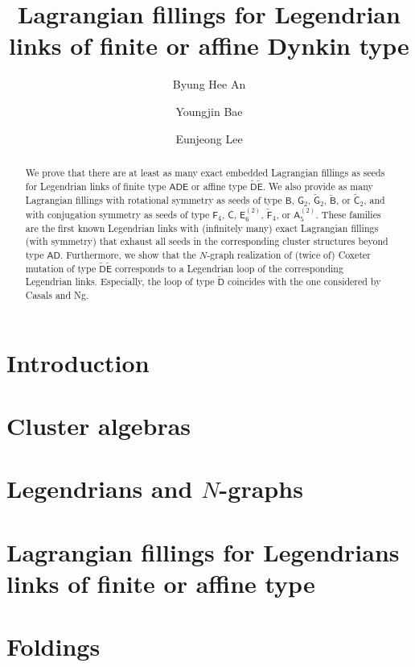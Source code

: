 \documentclass[reqno]{amsart}
\title{Lagrangian fillings for Legendrian links of finite or affine Dynkin type}
\author{Byung Hee An}
\author{Youngjin Bae}
\author{Eunjeong Lee}
\theoremstyle{plain}
\theoremstyle{remark}
\theoremstyle{definition}
\newcommand{\dynkinfont}{\mathsf}
\newcommand{\dynA}{\dynkinfont{A}}
\newcommand{\dynB}{\dynkinfont{B}}
\newcommand{\dynC}{\dynkinfont{C}}
\newcommand{\dynD}{\dynkinfont{D}}
\newcommand{\dynE}{\dynkinfont{E}}
\newcommand{\dynF}{\dynkinfont{F}}
\newcommand{\dynG}{\dynkinfont{G}}
\newcommand{\dynADE}{\dynkinfont{ADE}}
\newcommand{\exdynB}{\widetilde{\dynB}}
\newcommand{\exdynC}{\widetilde{\dynC}}
\newcommand{\exdynD}{\widetilde{\dynD}}
\newcommand{\exdynE}{\widetilde{\dynE}}
\newcommand{\exdynF}{\widetilde{\dynF}}
\newcommand{\exdynG}{\widetilde{\dynG}}
\newcommand{\1}{\sigma_1}
\newcommand{\2}{\sigma_2}
\newcommand{\3}{\sigma_3}
\newcommand{\4}{\sigma_4}
\newcommand{\5}{\sigma_{1,3}}
\numberwithin{equation}{section}
\begin{document}
\begin{abstract}
We prove that there are at least as many exact embedded Lagrangian fillings 
as seeds for Legendrian links of finite type $\dynADE$ or affine type $\exdynD \exdynE$. We also provide 
as many Lagrangian fillings with rotational symmetry as seeds of type $\dynB$, $\dynG_2$, $\exdynG_2$, $\exdynB$, or $\exdynC_2$, and with conjugation symmetry as seeds of type $\dynF_4$, $\dynC$, $\dynE_6^{(2)}$, $\exdynF_4$, or $\dynA_5^{(2)}$.
These families are the first known Legendrian links with (infinitely many) exact Lagrangian fillings (with symmetry) that exhaust all seeds in the corresponding cluster structures beyond type $\dynA \dynD$.
Furthermore, we show that the $N$-graph realization of (twice of) Coxeter mutation of type $\exdynD\exdynE$ corresponds to a Legendrian loop of the corresponding Legendrian links. Especially, the loop of type $\exdynD$ coincides with the one considered by Casals and Ng.
\end{abstract}

\maketitle

\tableofcontents

\section{Introduction}



\section{Cluster algebras}\label{sec:cluster algebras}



\section{Legendrians and \texorpdfstring{$N$-graphs}{N-graphs}}\label{sec:N-graph}



\section{Lagrangian fillings for Legendrians links of finite or affine type}\label{sec:N-graph of finite or affine type}



\section{Foldings}\label{section:folding}


\appendix





\end{document}
